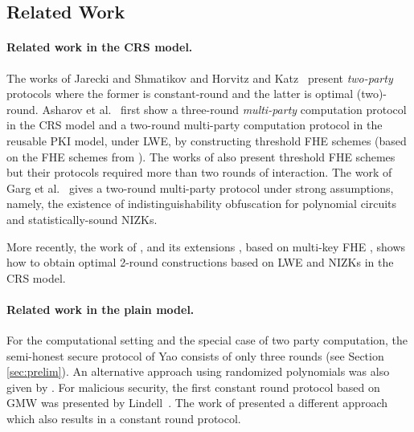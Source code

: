 \subsection {Related Work} \label{sec:relatedCRS}
\paragraph{Related work in the CRS model.}
The works of Jarecki and Shmatikov \cite{EC:JarShm07} and Horvitz and Katz~\cite{C:HorKat07} present {\em two-party} protocols where the former is constant-round and the latter is optimal (two)-round. Asharov et al.~\cite{EC:AJLTVW12} first show a three-round \emph{multi-party} computation protocol in the CRS model and a two-round multi-party computation protocol in the reusable PKI model, under LWE, by constructing threshold FHE schemes (based on the FHE schemes from \cite{FOCS:BraVai11,ITCS:BraGenVai12}). The works of \cite{TCC:BenDam10,MyeSerShe11} also present threshold FHE schemes but their protocols required more than two rounds of interaction. The work of Garg et al.~\cite{TCC:GGHR14} gives a two-round multi-party protocol under strong assumptions, namely, the existence of indistinguishability obfuscation for polynomial circuits and statistically-sound NIZKs.  

More recently, the work of \cite{MW16}, and its extensions \cite{C:BraPer16,TCC:PeiShi16}, based on multi-key FHE \cite{STOC:LopTroVai12,C:CleMcg15}, shows how to obtain optimal 2-round constructions based on LWE and NIZKs in the CRS model.%

\paragraph{Related work in the plain model.}
For the computational setting and the special case of two party computation, the semi-honest secure protocol of Yao \cite{FOCS:Yao82b,FOCS:Yao86,TCC:LinPin11} consists of only three rounds (see Section \ref{sec:prelim}).  An alternative approach
using randomized polynomials was also given by \cite{FOCS:IshKus00,AppIshKus05}. For malicious security, the first constant round protocol based on GMW was presented by Lindell~\cite{C:Lindell01}. The work of \cite{C:IshPraSah08} presented a different approach which also results in a constant round protocol.

